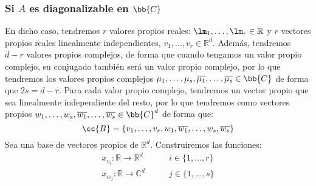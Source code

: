 \subsubsection{Si $A$ es diagonalizable en $\bb{C}$}
En dicho caso, tendremos $r$ valores propios reales: $\lm_1,\ldots,\lm_r\in \mathbb{R}$ y $r$ vectores propios reales linealmente independientes, $v_1,\ldots,v_r\in \mathbb{R}^d$. Además, tendremos $d-r$ valores propios complejos, de forma que cuando tengamos un valor propio complejo, su conjugado también será un valor propio complejo, por lo que tendremos los valores propios complejos $\mu_1,\ldots,\mu_s,\overline{\mu_1},\ldots,\overline{\mu_s}\in \bb{C}$ de forma que $2s = d-r$. Para cada valor propio complejo, tendremos un vector propio que sea linealmente independiente del resto, por lo que tendremos como vectores propios $w_1,\ldots,w_s,\overline{w_1},\ldots,\overline{w_s}\in \bb{C}^d$ de forma que:
\begin{equation*}
    \cc{B} = \{v_1,\ldots,v_r,w_1,\overline{w_1},\ldots,w_s,\overline{w_s}\}
\end{equation*}
Sea una base de vectores propios de $\mathbb{R}^d$. Construiremos las funciones:
\begin{align*}
    x_{v_i}:\mathbb{R}\rightarrow\mathbb{R}^d &\qquad i \in \{1,\ldots,r\} \\
    x_{w_j}:\mathbb{R}\rightarrow\mathbb{C}^d &\qquad j \in \{1,\ldots,s\} 
\end{align*}

